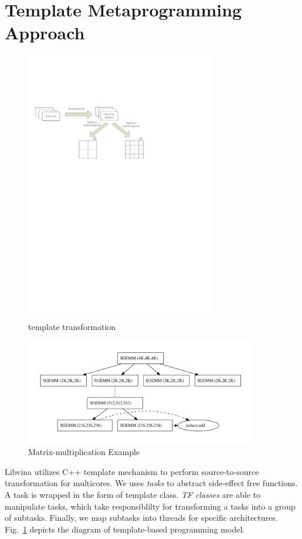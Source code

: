 \section{Template Metaprogramming Approach}

\begin{figure}[htp]
\includegraphics[width=3.3in]{../overview}
\caption{template transformation}\label{fig:overview}
\end{figure}

\hspace{-1ex}\begin{figure}[htp]
\includegraphics[width=4.0in]{../mmexample}
\caption{Matrix-multiplication Example}\label{fig:mmexample}
\end{figure}

Libvina utilizes C++ template mechanism to
perform source-to-source transformation for multicores. We uses
\emph{tasks} to abstract side-effect free functions. A task is
wrapped in the form of template class. \emph{TF classes} are able to
manipulate tasks, which take responsiblilty for transforming a tasks
into a group of subtasks. Finally, we map subtasks
into threads for specific architectures. Fig.~\ref{fig:overview}
depicts the diagram of template-based programming model.

